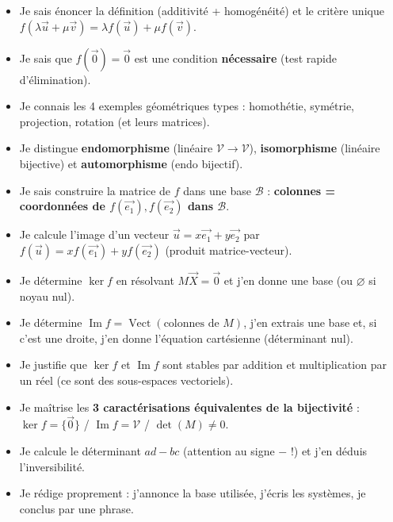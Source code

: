 \documentclass[11pt]{article}
\begin{document}
\begin{aretenir}
\begin{itemize}
  \item[$\square$] Je sais énoncer la définition (additivité + homogénéité) et le critère unique $f(\lambda\vec{u}+\mu\vec{v})=\lambda f(\vec{u})+\mu f(\vec{v})$.
  \item[$\square$] Je sais que $f(\vec{0})=\vec{0}$ est une condition \textbf{nécessaire} (test rapide d'élimination).
  \item[$\square$] Je connais les 4 exemples géométriques types : homothétie, symétrie, projection, rotation (et leurs matrices).
  \item[$\square$] Je distingue \textbf{endomorphisme} (linéaire $\mathcal{V}\to\mathcal{V}$), \textbf{isomorphisme} (linéaire bijective) et \textbf{automorphisme} (endo bijectif).
  \item[$\square$] Je sais construire la matrice de $f$ dans une base $\mathcal{B}$ : \textbf{colonnes = coordonnées de $f(\vec{e_1}), f(\vec{e_2})$ dans $\mathcal{B}$}.
  \item[$\square$] Je calcule l'image d'un vecteur $\vec{u}=x\vec{e_1}+y\vec{e_2}$ par $f(\vec{u}) = x f(\vec{e_1}) + y f(\vec{e_2})$ (produit matrice-vecteur).
  \item[$\square$] Je détermine $\ker f$ en résolvant $M\vec{X}=\vec{0}$ et j'en donne une base (ou $\varnothing$ si noyau nul).
  \item[$\square$] Je détermine $\operatorname{Im}f = \operatorname{Vect}(\text{colonnes de } M)$, j'en extrais une base et, si c'est une droite, j'en donne l'équation cartésienne (déterminant nul).
  \item[$\square$] Je justifie que $\ker f$ et $\operatorname{Im}f$ sont stables par addition et multiplication par un réel (ce sont des sous-espaces vectoriels).
  \item[$\square$] Je maîtrise les \textbf{3 caractérisations équivalentes de la bijectivité} : $\ker f=\{\vec{0}\}$ / $\operatorname{Im}f=\mathcal{V}$ / $\det(M)\neq 0$.
  \item[$\square$] Je calcule le déterminant $ad-bc$ (attention au signe $-$ !) et j'en déduis l'inversibilité.
  \item[$\square$] Je rédige proprement : j'annonce la base utilisée, j'écris les systèmes, je conclus par une phrase.
\end{itemize}
\end{aretenir}
\end{document}

